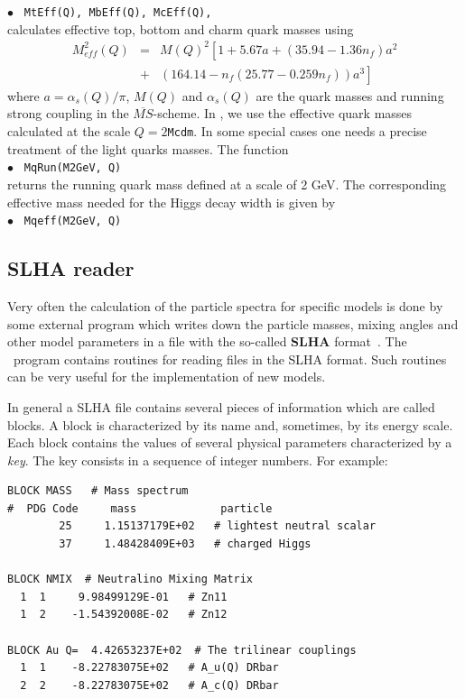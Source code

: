 \documentclass[12pt,a4paper]{article}
\begin{document}
\noindent$\bullet$ \verb| MtEff(Q), MbEff(Q), McEff(Q),  | \\
calculates effective top, bottom and charm quark masses using
~\cite{ParticleDataGroup:2020ssz}
\begin{eqnarray}
\label{meff}
 M_{eff}^2(Q)&=&M(Q)^2\left[1+5.67a + (35.94-1.36n_f)a^2 \right.\nonumber\\
 &+& \left.(164.14-n_f(25.77-0.259n_f))a^3\right]
\end{eqnarray}
where $a=\alpha_s(Q)/\pi$,    $M(Q)$  and $\alpha_s(Q)$    are the
quark masses and running strong coupling  in the
$\overline{MS}$-scheme. In \micro, we use the effective
quark masses calculated at the scale $Q=2${\tt Mcdm}.
In some special cases one needs a precise treatment of the light quarks masses. The function\\
\noindent$\bullet$ \verb| MqRun(M2GeV, Q)| \\
returns the  running quark mass defined at a scale of 2 GeV. The corresponding
effective mass needed for the Higgs decay width is given by \\
\noindent$\bullet$ \verb| Mqeff(M2GeV, Q)|


\subsection{SLHA reader}
\label{SLHA} 
Very often the calculation of the particle spectra for specific 
models is done by some external program which writes down 
the particle masses, mixing angles and other 
model parameters in a file with the so-called  {\bf SLHA} format~\cite{Skands:2003cj,Allanach:2008qq}. 
The \micro\ program contains routines for  reading files in the SLHA format. 
Such routines can be very useful for the implementation of new models.

In general a SLHA file contains several pieces of information 
which are called blocks. A block is characterized by its name and,
sometimes, by its energy scale. Each block contains the values of several physical parameters 
characterized by a {\it key}. The  key consists in a sequence of 
integer numbers. For example:
{\small
\begin{verbatim}
BLOCK MASS   # Mass spectrum
#  PDG Code     mass             particle
        25     1.15137179E+02   # lightest neutral scalar
        37     1.48428409E+03   # charged Higgs
  
BLOCK NMIX  # Neutralino Mixing Matrix
  1  1     9.98499129E-01   # Zn11
  1  2    -1.54392008E-02   # Zn12

BLOCK Au Q=  4.42653237E+02  # The trilinear couplings
  1  1    -8.22783075E+02   # A_u(Q) DRbar
  2  2    -8.22783075E+02   # A_c(Q) DRbar
\end{verbatim}
}  
\end{document}
